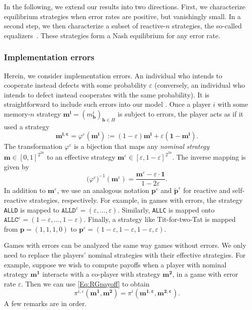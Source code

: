 \documentclass[9pt,twoside,lineno]{pnas-new}
\theoremstyle{plainCl1}
\theoremstyle{plainCl2}
\def\allc{\texttt{ALLC}}
\def\alld{\texttt{ALLD}}
\begin{document}
In the following, we extend our results into two directions. 
First, we characterize equilibrium strategies when error rates are positive, but vanishingly small. 
In a second step, we then characterize a subset of reactive-$n$ strategies, the so-called equalizers~\citep{boerlijst:AMM:1997,press:PNAS:2012}. 
These strategies form a Nash equilibrium for any error rate. 

\subsubsection*{Implementation errors}
Herein, we consider implementation errors. 
An individual who intends to cooperate instead defects with some probability $\varepsilon$ (conversely, an individual who intends to defect instead cooperates with the same probability). 
It is straightforward to include such errors into our model \citep[see also][]{park:NComms:2022}. 
Once a player $i$ with some memory-$n$ strategy \(\mathbf{m^i} \!=\! (m^i_\mathbf{h})_{\mathbf{h}\in H}\) is subject to errors, the player acts as if it used a strategy
\begin{equation}
\mathbf{m^{i,\varepsilon}} = \varphi^\varepsilon(\mathbf{m^i}) := (1\!-\!\varepsilon)\mathbf{m^i} + \varepsilon (\mathbf{1}-\mathbf{m^i}). 
\end{equation}
The transformation $\varphi^\varepsilon$ is a bijection that maps any {\it nominal strategy} $\mathbf{m} \in [0,1]^{2^{2n}}$ to an effective strategy $\mathbf{m}^\varepsilon \in [\varepsilon,1\!-\!\varepsilon]^{2^{2n}}$. The inverse mapping is given by
\begin{equation}
\big(\varphi^\varepsilon\big)^{-1}(\mathbf{m}^\varepsilon) = \frac{\mathbf{m}^\varepsilon - \varepsilon\cdot \mathbf{1}}{1\!-\!2\varepsilon}. 
\end{equation}
In addition to $\mathbf{m}^\varepsilon$, we use an analogous notation $\mathbf{p}^\varepsilon$ and $\mathbf{\tilde p}^\varepsilon$ for reactive and self-reactive strategies, respectively. 
For example, in games with errors, the strategy \alld{} is mapped to $\alld^\varepsilon = (\varepsilon,\ldots,\varepsilon)$. Similarly, \allc{} is mapped onto $\allc^\varepsilon = (1\!-\!\varepsilon,\ldots,1\!-\!\varepsilon)$. Finally, a strategy like Tit-for-two-Tat is mapped from $\mathbf{p}=(1,1,1,0)$ to $\mathbf{p}^\varepsilon = (1\!-\!\varepsilon,1\!-\!\varepsilon,1\!-\!\varepsilon,\varepsilon)$. 

Games with errors can be analyzed the same way games without errors.
We only need to replace the players' nominal strategies with their effective strategies. 
For example, suppose we wish to compute payoffs when a player with nominal strategy $\mathbf{m^1}$ interacts with a co-player with strategy $\mathbf{m^2}$, in a game with error rate $\varepsilon$. Then we can use \eqref{Eq:RGpayoff} to obtain
\begin{equation}
\pi^{i,\varepsilon}(\mathbf{m^1},\mathbf{m^2}) = \pi^i(\mathbf{m^{1,\varepsilon}},\mathbf{m^{2,\varepsilon}}). 
\end{equation}
A few remarks are in order. 
\end{document}
